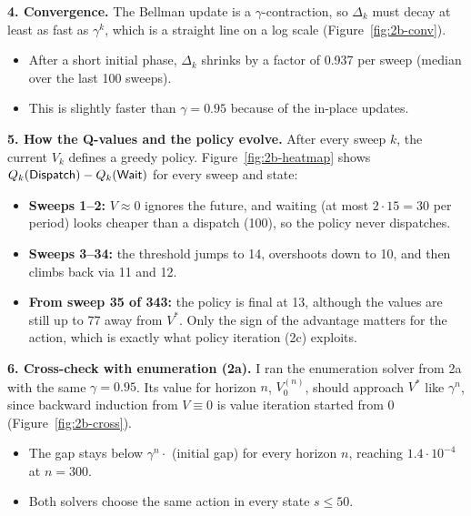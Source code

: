 
\textbf{4. Convergence.} The Bellman update is a $\gamma$-contraction, so $\Delta_k$ must decay at least as fast as $\gamma^k$, which is a straight line on a log scale (Figure~\ref{fig:2b-conv}).
\begin{itemize}
  \item After a short initial phase, $\Delta_k$ shrinks by a factor of 0.937 per sweep (median over the last 100 sweeps).
  \item This is slightly faster than $\gamma = 0.95$ because of the in-place updates.
\end{itemize}


\textbf{5. How the Q-values and the policy evolve.} After every sweep $k$, the current $V_k$ defines a greedy policy. Figure~\ref{fig:2b-heatmap} shows $Q_k(\textsf{Dispatch}) - Q_k(\textsf{Wait})$ for every sweep and state:
\begin{itemize}
  \item \textbf{Sweeps 1--2:} $V \approx 0$ ignores the future, and waiting (at most $2 \cdot 15 = 30$ per period) looks cheaper than a dispatch (100), so the policy never dispatches.
  \item \textbf{Sweeps 3--34:} the threshold jumps to 14, overshoots down to 10, and then climbs back via 11 and 12.
  \item \textbf{From sweep 35 of 343:} the policy is final at 13, although the values are still up to 77 away from $V^*$. Only the sign of the advantage matters for the action, which is exactly what policy iteration (2c) exploits.
\end{itemize}


\textbf{6. Cross-check with enumeration (2a).} I ran the enumeration solver from 2a with the same $\gamma = 0.95$. Its value for horizon $n$, $V_0^{(n)}$, should approach $V^*$ like $\gamma^n$, since backward induction from $V \equiv 0$ is value iteration started from 0 (Figure~\ref{fig:2b-cross}).
\begin{itemize}
  \item The gap stays below $\gamma^n \cdot$ (initial gap) for every horizon $n$, reaching $1.4 \cdot 10^{-4}$ at $n = 300$.
  \item Both solvers choose the same action in every state $s \leq 50$.
\end{itemize}

